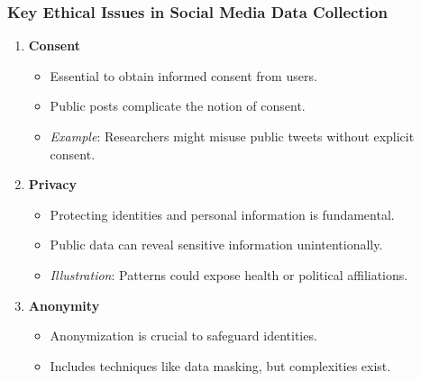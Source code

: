 \documentclass{beamer}
\begin{document}
\begin{frame}[fragile]
    \frametitle{Key Ethical Issues in Social Media Data Collection}
    \begin{enumerate}
        \item \textbf{Consent}
            \begin{itemize}
                \item Essential to obtain informed consent from users.
                \item Public posts complicate the notion of consent.
                \item \textit{Example}: Researchers might misuse public tweets without explicit consent.
            \end{itemize}
            
        \item \textbf{Privacy}
            \begin{itemize}
                \item Protecting identities and personal information is fundamental.
                \item Public data can reveal sensitive information unintentionally.
                \item \textit{Illustration}: Patterns could expose health or political affiliations.
            \end{itemize}

        \item \textbf{Anonymity}
            \begin{itemize}
                \item Anonymization is crucial to safeguard identities.
                \item Includes techniques like data masking, but complexities exist.
            \end{itemize}
    \end{enumerate}
\end{frame}
\end{document}
